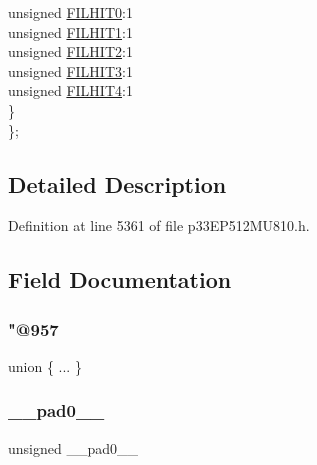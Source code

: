 \begin{DoxyCompactItemize}
\begin{tabbing}
\>\>unsigned \hyperlink{structtag_c2_v_e_c_b_i_t_s_adcc02c6f556be9929ff23762437c4dfa}{FILHIT0}:1\\
\>\>unsigned \hyperlink{structtag_c2_v_e_c_b_i_t_s_a4ea961262bcbb993390a2c5fb0ec3441}{FILHIT1}:1\\
\>\>unsigned \hyperlink{structtag_c2_v_e_c_b_i_t_s_a8221a8d8d3f31d4ef70bdb8237c90e9d}{FILHIT2}:1\\
\>\>unsigned \hyperlink{structtag_c2_v_e_c_b_i_t_s_a6442e8f609be4a3f77dd883dcfaa9cb7}{FILHIT3}:1\\
\>\>unsigned \hyperlink{structtag_c2_v_e_c_b_i_t_s_ad6ae57defca18f986f3234469312ddb1}{FILHIT4}:1\\
\>\} \\
\}; \\

\end{tabbing}\end{DoxyCompactItemize}


\subsection{Detailed Description}


Definition at line 5361 of file p33\+E\+P512\+M\+U810.\+h.



\subsection{Field Documentation}
\mbox{\label{structtag_c2_v_e_c_b_i_t_s_a9b89dc391f2757a0d136ebfa3d55a22c}} 
\subsubsection{\texorpdfstring{"@957}{@957}}
{\footnotesize\ttfamily union \{ ... \} }

\mbox{\label{structtag_c2_v_e_c_b_i_t_s_adf71f3d8410c1f1dbbc96680a92c49af}} 
\subsubsection{\texorpdfstring{\+\_\+\+\_\+pad0\+\_\+\+\_\+}{\_\_pad0\_\_}}
{\footnotesize\ttfamily unsigned \+\_\+\+\_\+pad0\+\_\+\+\_\+}



